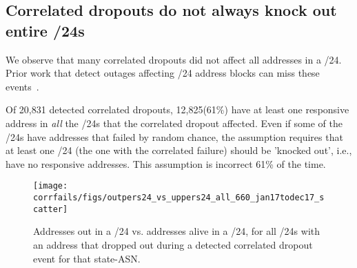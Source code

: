 



\subsection{Correlated dropouts do not always knock out entire  /24s}

We observe that many correlated dropouts did not affect all addresses
in a /24. Prior work that detect outages affecting /24 address blocks
can miss these events~\cite{trinocular, advancing-outage-art}.

Of 20,831 detected correlated dropouts, 12,825(61\%) have at least one
responsive address in \emph{all} the /24s that the correlated dropout
affected. Even if some of the /24s have addresses that failed by
random chance, the  assumption requires that at least one
/24 (the one with the correlated failure) should be 'knocked out',
i.e., have no responsive addresses. This assumption is incorrect 61\%
of the time.

\begin{figure}[t]
\centering
\texttt{[image: corrfails/figs/outpers24\_vs\_uppers24\_all\_660\_jan17todec17\_scatter]}
\caption{
\label{fig:outpers24_vs_uppers24_all}
Addresses out in a /24 vs. addresses alive in a /24, for all /24s with
an address that dropped out during a detected correlated
dropout event for that state-ASN.}
\end{figure}

